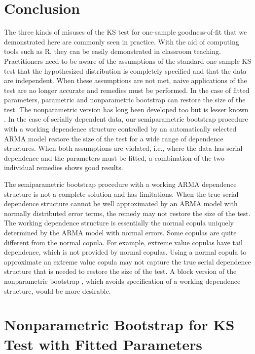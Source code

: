 \documentclass[12pt, letterpaper, titlepage]{article}
\begin{document}
\section{Conclusion}
\label{sec:conclusion}

The three kinds of misuses of the KS test for one-sample goodness-of-fit that we
demonstrated here are commonly seen in practice. With the aid of computing tools
such as R, they can be easily demonstrated in classroom teaching. Practitioners
need to be aware of the assumptions of the standard one-sample KS test that the
hypothesized distribution is completely specified and that the data are
independent. When these assumptions are not met, naive applications of the test
are no longer accurate and remedies must be performed. In the
case of fitted parameters, parametric and nonparametric bootstrap can restore
the size of the test. The nonparametric version has long been developed too but
is lesser known \citep{babu2004goodness}. In the case of serially dependent data,
our semiparametric bootstrap procedure with a working dependence structure
controlled by an automatically selected ARMA model restore the size of the test
for a wide range of dependence structures.
When both assumptions are violated, i.e., where the data has serial 
dependence and the parameters must be fitted, a combination of the two
individual remedies shows good results.


The semiparametric bootstrap procedure with a working ARMA dependence structure
is not a complete solution and has limitations. When the true serial dependence
structure cannot be well approximated by an ARMA model with normally distributed
error terms, the remedy may not restore the size of the test. The working
dependence structure is essentially the normal copula uniquely determined by the
ARMA model with normal errors. Some copulas are quite different from the normal
copula. For example, extreme value copulas have tail dependence, which is not
provided by normal copulas.
Using a normal copula to approximate an extreme value copula may not capture the
true serial dependence structure that is needed to restore the size of the
test. A block version of the nonparametric bootstrap \citep{babu2004goodness},
which avoids specification of a working dependence structure, would be more
desirable.


\appendix

\section{Nonparametric Bootstrap for KS Test with Fitted Parameters}
\end{document}
